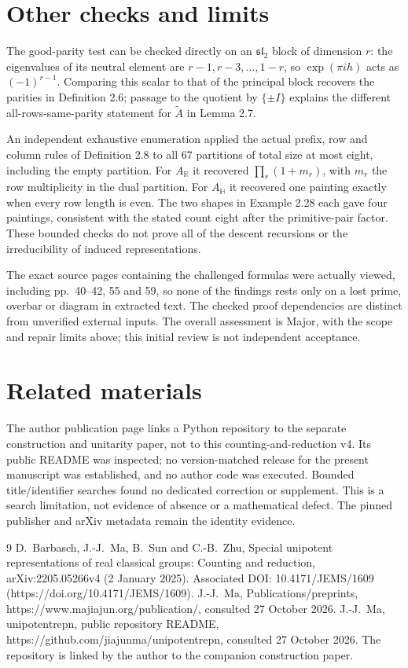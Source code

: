 \documentclass[10pt]{article}
\begin{document}
\section*{Other checks and limits}
The good-parity test can be checked directly on an \(\mathfrak{sl}_2\) block of dimension \(r\): the eigenvalues of its neutral element are \(r-1,r-3,\ldots,1-r\), so \(\exp(\pi i h)\) acts as \((-1)^{r-1}\). Comparing this scalar to that of the principal block recovers the parities in Definition 2.6; passage to the quotient by \(\{\pm I\}\) explains the different all-rows-same-parity statement for \(\widetilde A\) in Lemma 2.7.\par
An independent exhaustive enumeration applied the actual prefix, row and column rules of Definition 2.8 to all \(67\) partitions of total size at most eight, including the empty partition. For \(A_{\mathbb R}\) it recovered \(\prod_r(1+m_r)\), with \(m_r\) the row multiplicity in the dual partition. For \(A_{\mathbb H}\) it recovered one painting exactly when every row length is even. The two shapes in Example 2.28 each gave four paintings, consistent with the stated count eight after the primitive-pair factor. These bounded checks do not prove all of the descent recursions or the irreducibility of induced representations.\par
The exact source pages containing the challenged formulas were actually viewed, including pp. 40–42, 55 and 59, so none of the findings rests only on a lost prime, overbar or diagram in extracted text. The checked proof dependencies are distinct from unverified external inputs. The overall assessment is Major, with the scope and repair limits above; this initial review is not independent acceptance.\par
\section*{Related materials}
The author publication page links a Python repository to the separate construction and unitarity paper, not to this counting-and-reduction v4. Its public README was inspected; no version-matched release for the present manuscript was established, and no author code was executed. Bounded title/identifier searches found no dedicated correction or supplement. This is a search limitation, not evidence of absence or a mathematical defect. The pinned publisher and arXiv metadata remain the identity evidence.\par
9 D. Barbasch, J.-J. Ma, B. Sun and C.-B. Zhu, Special unipotent representations of real classical groups: Counting and reduction, arXiv:2205.05266v4 (2 January 2025). Associated DOI: 10.4171/JEMS/1609 (https://doi.org/10.4171/JEMS/1609). J.-J. Ma, Publications/preprints, https://www.majiajun.org/publication/, consulted 27 October 2026. J.-J. Ma, unipotentrepn, public repository README, https://github.com/jiajunma/unipotentrepn, consulted 27 October 2026. The repository is linked by the author to the companion construction paper.\par
\end{document}
